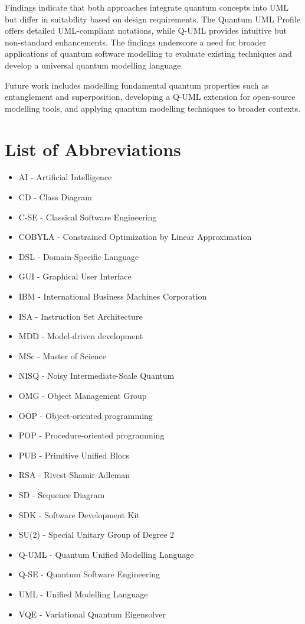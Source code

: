 \documentclass{article}
\begin{document}
Findings indicate that both approaches integrate quantum concepts into UML but differ in suitability based on design requirements. The Quantum UML Profile offers detailed UML-compliant notations, while Q-UML provides intuitive but non-standard enhancements. The findings underscore a need for broader applications of quantum software modelling to evaluate existing techniques and develop a universal quantum modelling language.

Future work includes modelling fundamental quantum properties such as entanglement and superposition, developing a Q-UML extension for open-source modelling tools, and applying quantum modelling techniques to broader contexts. 

\newpage

\listoffigures
\newpage

\section*{List of Abbreviations}
\begin{itemize}
    \item AI - Artificial Intelligence
    \item CD - Class Diagram
    \item C-SE - Classical Software Engineering
    \item COBYLA - Constrained Optimization by Linear Approximation
    \item DSL - Domain-Specific Language
    \item GUI - Graphical User Interface
    \item IBM - International Business Machines Corporation
    \item ISA - Instruction Set Architecture
    \item MDD - Model-driven development
    \item MSc - Master of Science
    \item NISQ - Noisy Intermediate-Scale Quantum
    \item OMG - Object Management Group
    \item OOP - Object-oriented programming
    \item POP - Procedure-oriented programming
    \item PUB - Primitive Unified Blocs
    \item RSA - Rivest-Shamir-Adleman
    \item SD - Sequence Diagram
    \item SDK - Software Development Kit
    \item SU(2) - Special Unitary Group of Degree 2
    \item Q-UML - Quantum Unified Modelling Language
    \item Q-SE - Quantum Software Engineering
    \item UML - Unified Modelling Language
    \item VQE - Variational Quantum Eigensolver
\end{itemize}
\newpage
\end{document}
